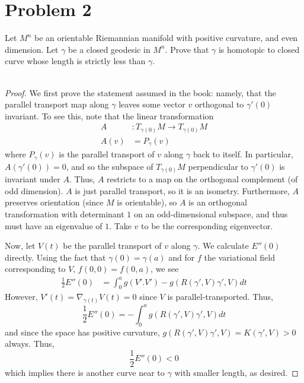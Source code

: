 \documentclass[fontsize=11pt]{scrartcl} %
\numberwithin{equation}{section} %
\numberwithin{figure}{section} %
\numberwithin{table}{section} %
\begin{document}
\newpage

\section*{Problem 2}
Let $M^n$ be an orientable Riemannian manifold with positive curvature, and even
dimension. Let $\gamma$ be a closed geodesic in $M^n$. Prove that $\gamma$ is
homotopic to closed curve whose length is strictly less than $\gamma$.
\\
\\
\begin{proof}
    We first prove the statement assumed in the book: namely, that the parallel
    transport map along $\gamma$ leaves some vector $v$ orthogonal to
    $\gamma'(0)$ invariant. To see this, note that the linear transformation
    \[
\begin{aligned}
    A&:T_{\gamma(0)}M\to T_{\gamma(0)}M\\
    A(v) &= P_{\gamma}(v)
\end{aligned}
    \]
    where $P_{\gamma}(v)$ is the parallel transport of $v$ along $\gamma$ back
    to itself. In particular, $A(\gamma'(0)) = 0$, and so the subspace of
    $T_{\gamma(0)}M$ perpendicular to $\gamma'(0)$ is invariant under $A$. Thus,
    $A$ restricts to a map on the orthogonal complement (of odd dimension). $A$
    is just parallel transport, so it is an isometry. Furthermore, $A$ preserves
    orientation (since $M$ is orientable), so $A$ is an orthogonal transformation
        with determinant $1$ on an odd-dimensional subspace, and thus must have
        an eigenvalue of $1$. Take $v$ to be the corresponding eigenvector.

    Now, let $V(t)$ be the parallel transport of $v$ along $\gamma$. We
    calculate $E''(0)$ directly. Using the fact that $\gamma(0)=\gamma(a)$ and
    for $f$ the variational field corresponding to $V$, $f(0,0)=f(0,a)$, we see
    \[
        \begin{aligned}
            \frac{1}{2}E''(0) &= \int_0^a g(V'.V') - g(R(\gamma',V)\gamma',V)dt
    \end{aligned}
    \]
    However, $V'(t) = \nabla_{\gamma(t)}V(t) = 0$ since $V$ is
    parallel-transported. Thus,
    \[
        \frac{1}{2}E''(0) = -\int_0^a g(R(\gamma',V)\gamma',V)dt
    \]
    and since the space has positive curvature, $g(R(\gamma',V)\gamma',V) =
    K(\gamma',V) >0$ always. Thus,
    \[
        \frac{1}{2}E''(0) < 0
    \]
    which implies there is another curve near to $\gamma$ with smaller length,
    as desired.
\end{proof}
\end{document}
